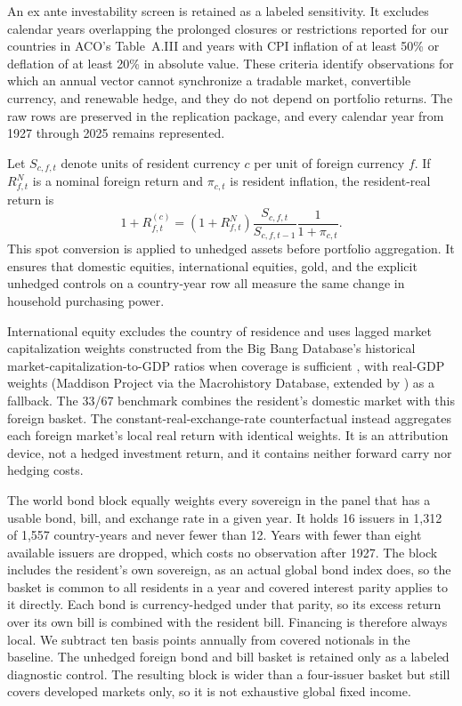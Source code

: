 \documentclass[11pt]{article}
\begin{document}
An ex ante investability
screen is retained as a labeled sensitivity. It excludes calendar years
overlapping the prolonged closures or restrictions reported for our countries
in ACO's Table~A.III and years with CPI inflation of at least 50\% or deflation
of at least 20\% in absolute value. These criteria identify observations for
which an annual vector cannot synchronize a tradable market, convertible
currency, and renewable hedge, and they do not depend on portfolio returns. The
raw rows are preserved in the replication package, and every calendar year from
1927 through 2025 remains represented.

Let $S_{c,f,t}$ denote units of resident currency $c$ per unit of foreign
currency $f$. If $R^{N}_{f,t}$ is a nominal foreign return and $\pi_{c,t}$ is
resident inflation, the resident-real return is
\begin{equation}
  1+R^{(c)}_{f,t}
  =(1+R^{N}_{f,t})
  \frac{S_{c,f,t}}{S_{c,f,t-1}}
  \frac{1}{1+\pi_{c,t}}.
  \label{eq:conversion}
\end{equation}
This spot conversion is applied to unhedged assets before portfolio
aggregation. It ensures that domestic equities, international equities, gold,
and the explicit unhedged controls on a country-year row all
measure the same change in household purchasing power.

International equity excludes the country of residence and uses lagged market
capitalization weights constructed from the Big Bang Database's historical
market-capitalization-to-GDP ratios when coverage is sufficient
\citep{KuvshinovZimmermann2022}, with real-GDP weights (Maddison Project via the
Macrohistory Database, extended by \citealt{MullerXuLehbibChen2025}) as a
fallback. The 33/67 benchmark combines the resident's domestic market with this
foreign basket. The constant-real-exchange-rate counterfactual instead
aggregates each foreign market's local real return with identical weights. It
is an attribution device, not a hedged investment return, and it contains
neither forward carry nor hedging costs.

The world bond block equally weights every sovereign in the panel that has a
usable bond, bill, and exchange rate in a given year. It holds 16 issuers in
1,312 of 1,557 country-years and never fewer than 12. Years with fewer than
eight available issuers are dropped, which costs no observation after 1927. The
block includes the resident's own sovereign, as an actual global bond index
does, so the basket is common to all residents in a year and covered interest
parity applies to it directly. Each bond is currency-hedged under that parity,
so its excess return over its own bill is combined with the resident bill.
Financing is therefore always local. We subtract ten basis points annually from
covered notionals in the baseline. The unhedged foreign bond and bill basket is
retained only as a labeled diagnostic control. The resulting block is wider
than a four-issuer basket but still covers developed markets only, so it is not
exhaustive global fixed income.
\end{document}
